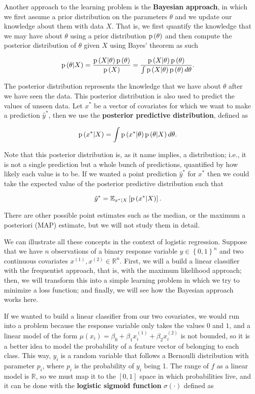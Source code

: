 Another approach to the learning problem is the \textbf{Bayesian approach}, in which we first assume a prior distribution on the parameters $\theta$ and we update our knowledge about them with data $X$. That is, we first quantify the knowledge that we may have about $\theta$ using a prior distribution $\mathrm{p}\left( \theta \right)$ and then compute the posterior distribution of $\theta$ given $X$ using Bayes' theorem as such

$$
  \mathrm{p}\left( \theta | X \right) = \frac{\mathrm{p}\left( X | \theta \right) \mathrm{p}\left( \theta \right)}{\mathrm{p}\left( X \right)} = \frac{\mathrm{p}\left( X | \theta \right) \mathrm{p}\left( \theta \right)}{\int \mathrm{p}\left( X | \theta \right) \mathrm{p}\left( \theta \right) d\theta}.
$$

The posterior distribution represents the knowledge that we have about $\theta$ after we have seen the data. This posterior distribution is also used to predict the values of unseen data. Let $x^*$ be a vector of covariates for which we want to make a prediction $\hat{y}^*$, then we use the \textbf{posterior predictive distribution}, defined as

$$
  \mathrm{p}\left( x^* | X \right) = \int \mathrm{p}\left( x^* | \theta \right) \mathrm{p}\left( \theta | X \right) d\theta.
$$

Note that this posterior distribution is, as it name implies, a distribution; i.e., it is not a single prediction but a whole bunch of predictions, quantified by how likely each value is to be. If we wanted a point prediction $\hat{y}^*$ for $x^*$ then we could take the expected value of the posterior predictive distribution such that

$$
  \hat{y}^* = \mathbb{E}_{x^* | X} \left[ \mathrm{p}\left( x^* | X \right) \right].
$$

There are other possible point estimates such as the median, or the maximum a posteriori (MAP) estimate, but we will not study them in detail.

We can illustrate all these concepts in the context of logistic regression. Suppose that we have $n$ observations of a binary response variable $y \in \left\{0, 1\right\}^n$ and two continuous covariates $x^{(1)}, x^{(2)} \in \mathbb{R}^n$. First, we will a build a linear classifier with the frequentist approach, that is, with the maximum likelihood approach; then, we will transform this into a simple learning problem in which we try to minimize a loss function; and finally, we will see how the Bayesian approach works here.

If we wanted to build a linear classifier from our two covariates, we would run into a problem because the response variable only takes the values $0$ and $1$, and a linear model of the form $\mu(x_i) = \beta_0 + \beta_1 x_i^{(1)} + \beta_2 x_i^{(2)}$ is not bounded, so it is a better idea to model the probability of a feature vector of belonging to each class.
This way, $y_i$ is a random variable that follows a Bernoulli distribution with parameter $p_i$, where $p_i$ is the probability of $y_i$ being 1.
The range of $f$ as a linear model is $\mathbb{R}$, so we must map it to the $\left[ 0,1 \right]$ space in which probabilities live, and it can be done with the \textbf{logistic sigmoid function} $\sigma \left( \cdot \right)$ defined as \cite[p.~114]{christopher2006pattern}

